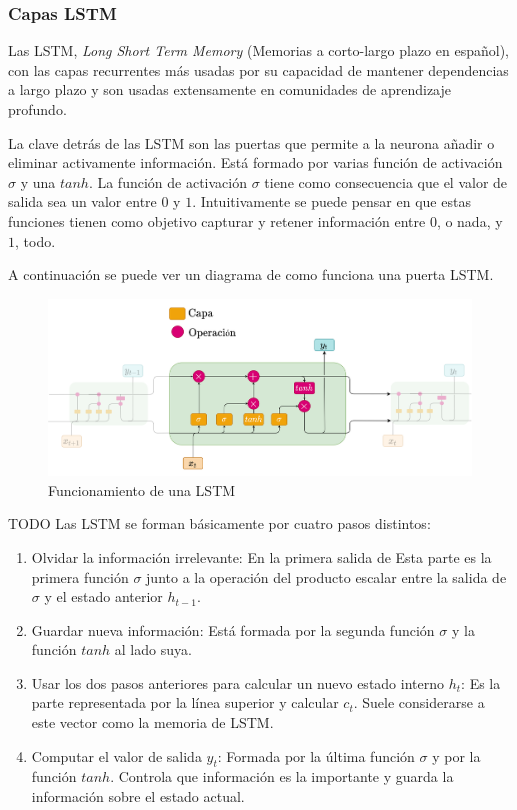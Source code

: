 \subsubsection{Capas LSTM}\label{lstm_theory}

Las LSTM, \textit{Long Short Term Memory} (Memorias a corto-largo plazo en español), con las capas recurrentes más usadas por su capacidad de mantener dependencias a largo plazo y son usadas extensamente en comunidades de aprendizaje profundo.
\newline

La clave detrás de las LSTM son las puertas que permite a la neurona añadir o eliminar activamente información. Está formado por varias función de activación $\sigma$ y una $tanh$. La función de activación $\sigma$ tiene como consecuencia que el valor de salida sea un valor entre $0$ y $1$. Intuitivamente se puede pensar en que estas funciones tienen como objetivo  capturar y retener información entre $0$, o nada, y $1$, todo.

A continuación se puede ver un diagrama de como funciona una puerta LSTM.


\begin{figure}[H]
    \centering
    \includegraphics[width=16cm]{images/state-of-art/rnn/lstm.png}
    \caption{Funcionamiento de una LSTM}
\end{figure}


TODO %
Las LSTM se forman básicamente por cuatro pasos distintos:
\begin{enumerate}
    \item Olvidar la información irrelevante: En la primera salida de Esta parte es la primera función $\sigma$ junto a la operación del producto escalar entre la salida de $\sigma$ y el estado anterior $h_{t-1}$.
    \item Guardar nueva información: Está formada por la segunda función $\sigma$ y la función $tanh$ al lado suya.
    \item Usar los dos pasos anteriores para calcular un nuevo estado interno $h_t$: Es la parte representada por la línea superior y calcular $c_t$. Suele considerarse a este vector como la memoria de LSTM.
    \item Computar el valor de salida $y_t$: Formada por la última función $\sigma$ y por la función $tanh$. Controla que información es la importante y guarda la información sobre el estado actual.
\end{enumerate}

